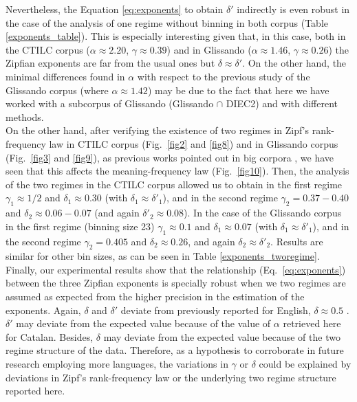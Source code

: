 \documentclass[10pt,letterpaper]{article}
\begin{document}
Nevertheless, the Equation \ref{eq:exponents} to obtain $\delta'$ indirectly is even robust in the case of the analysis of one regime without binning in both corpus (Table \ref{exponents_table}). This is especially interesting given that, in this case, both in the CTILC corpus ($\alpha \approx 2.20$, $\gamma \approx 0.39$) and in Glissando ($\alpha \approx 1.46$, $\gamma \approx 0.26$) the Zipfian exponents are far from the usual ones but $\delta \approx \delta'$. On the other hand, the minimal differences found in $\alpha$ with respect to the previous study of the Glissando corpus \cite{entropy2019} (where $\alpha \approx 1.42$) may be due to the fact that here we have worked with a subcorpus of Glissando (Glissando $\cap$ DIEC2) and with different methods. \\

On the other hand, after verifying the existence of two regimes in Zipf's rank-frequency law in CTILC corpus (Fig.~\ref{fig2} and \ref{fig8}) and in Glissando corpus (Fig.~\ref{fig3} and \ref{fig9}), as previous works pointed out in big corpora \cite{ferrer2001two, Williams2015, petersen2012languages}, we have seen that this affects the meaning-frequency law (Fig.~\ref{fig10}). Then, the analysis of the two regimes in the CTILC corpus allowed us to obtain in the first regime $\gamma_1 \approx 1/2$ and $\delta_1 \approx 0.30$ (with $\delta_1 \approx \delta'_1$), and in the second regime $\gamma_2 = 0.37-0.40$ and $\delta_2 \approx 0.06-0.07$ (and again $\delta'_2 \approx 0.08$). In the case of the Glissando corpus in the first regime (binning size 23) $\gamma_1 \approx 0.1$ and $\delta_1 \approx 0.07$ (with $\delta_1 \approx \delta'_1$), and in the second regime $\gamma_2 = 0.405$ and $\delta_2 \approx 0.26$, and again $\delta_2 \approx \delta'_2 $. Results are similar for other bin sizes, as can be seen in Table \ref{exponents_tworegime}.\\

Finally, our experimental results show that the relationship (Eq.~\ref{eq:exponents}) between the three Zipfian exponents  \cite{Ferrer2017, Ferrer2016} is specially robust when we two regimes are assumed as expected from the higher precision in the estimation of the exponents. Again, $\delta$ and $\delta'$ deviate from previously reported for English, $\delta \approx 0.5$ \cite{Zipf_MFL,Ferrer2017, Ferrer2016}. $\delta'$ may deviate from the expected value because of the value of  $\alpha$ retrieved here for Catalan. Besides, $\delta$ may deviate from the expected value because of the two regime structure of the data.
Therefore, as a hypothesis to corroborate in future research employing  more languages, the variations in $\gamma$ or $\delta$ could be explained by deviations in Zipf's rank-frequency law or the underlying two regime structure reported here. \\
\end{document}
